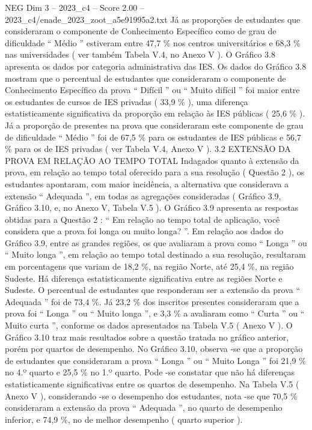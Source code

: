 \begin{textsample}{NEG Dim 3 – 2023\_c4 – Score 2.00 – 2023\_c4/enade\_2023\_zoot\_a5e91995a2.txt}
Já as proporções de estudantes que consideraram o componente de Conhecimento Específico como de grau de dificuldade “ Médio ” estiveram entre 47,7 \% nos centros universitários e 68,3 \% nas universidades ( ver também Tabela V.4, no Anexo V ).
O Gráfico 3.8 apresenta os dados por categoria administrativa das IES.
Os dados do Gráfico 3.8 mostram que o percentual de estudantes que consideraram o componente de Conhecimento Específico da prova “ Difícil ” ou “ Muito difícil ” foi maior entre os estudantes de cursos de IES privadas ( 33,9 \% ), uma diferença estatisticamente significativa da proporção em relação às IES públicas ( 25,6 \% ).
Já a proporção de presentes na prova que consideraram este componente de grau de dificuldade “ Médio ” foi de 67,5 \% para os estudantes de IES públicas e 56,7 \% para os de IES privadas ( ver Tabela V.4, Anexo V ). 3.2 EXTENSÃO DA PROVA EM RELAÇÃO AO TEMPO TOTAL Indagados quanto à extensão da prova, em relação ao tempo total oferecido para a sua resolução ( Questão 2 ), os estudantes apontaram, com maior incidência, a alternativa que considerava a extensão “ Adequada ”, em todas as agregações consideradas ( Gráfico 3.9, Gráfico 3.10, e, no Anexo V, Tabela V.5 ).
O Gráfico 3.9 apresenta as respostas obtidas para a Questão 2 : “ Em relação ao tempo total de aplicação, você considera que a prova foi longa ou muito longa? ”.
Em relação aos dados do Gráfico 3.9, entre as grandes regiões, os que avaliaram a prova como “ Longa ” ou “ Muito longa ”, em relação ao tempo total destinado a sua resolução, resultaram em porcentagens que variam de 18,2 \%, na região Norte, até 25,4 \%, na região Sudeste.
Há diferença estatisticamente significativa entre as regiões Norte e Sudeste.
O percentual de estudantes que responderam ser a extensão da prova “ Adequada ” foi de 73,4 \%.
Já 23,2 \% dos inscritos presentes consideraram que a prova foi “ Longa ” ou “ Muito longa ”, e 3,3 \% a avaliaram como “ Curta ” ou “ Muito curta ”, conforme os dados apresentados na Tabela V.5 ( Anexo V ).
O Gráfico 3.10 traz mais resultados sobre a questão tratada no gráfico anterior, porém por quartos de desempenho.
No Gráfico 3.10, observa -se que a proporção de estudantes que consideraram a prova “ Longa ” ou “ Muito Longa ” foi 21,9 \% no 4.º quarto e 25,5 \% no 1.º quarto.
Pode -se constatar que não há diferenças estatisticamente significativas entre os quartos de desempenho.
Na Tabela V.5 ( Anexo V ), considerando -se o desempenho dos estudantes, nota -se que 70,5 \% consideraram a extensão da prova “ Adequada ”, no quarto de desempenho inferior, e 74,9 \%, no de melhor desempenho ( quarto superior ).

\end{textsample}
